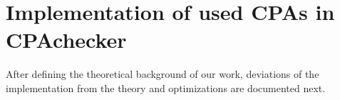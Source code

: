 \chapter{Implementation of used CPAs in CPAchecker}
After defining the theoretical background of our work, deviations of the implementation from the theory and optimizations are documented next.




